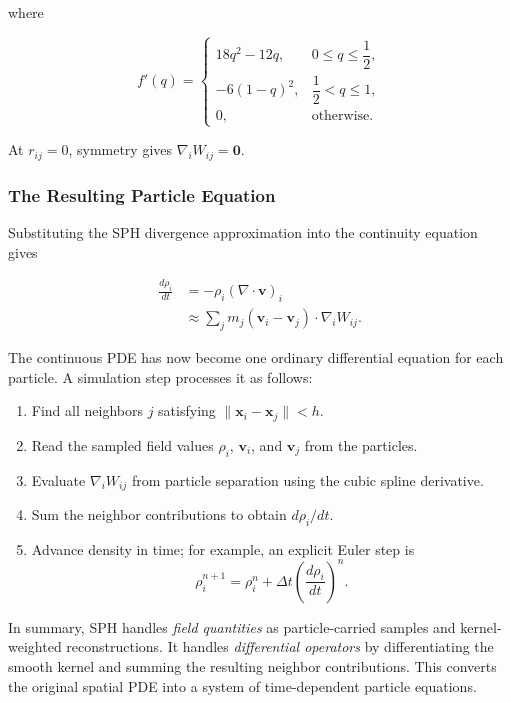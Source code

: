 \documentclass[11pt]{article}
\begin{document}
where

\begin{equation}
    f'(q)=
    \begin{cases}
        18q^2-12q,
            & 0 \leq q \leq \dfrac{1}{2}, \\
        -6(1-q)^2,
            & \dfrac{1}{2}<q\leq1, \\
        0,
            & \text{otherwise}.
    \end{cases}
\end{equation}

At $r_{ij}=0$, symmetry gives $\nabla_iW_{ij}=\mathbf{0}$.

\subsubsection{The Resulting Particle Equation}

Substituting the SPH divergence approximation into the continuity equation
gives

\begin{align}
    \frac{d\rho_i}{dt}
    &= -\rho_i(\nabla\cdot\mathbf{v})_i \\
    &\approx \sum_j m_j(\mathbf{v}_i-\mathbf{v}_j)
    \cdot\nabla_iW_{ij}.
\end{align}

The continuous PDE has now become one ordinary differential equation for each
particle. A simulation step processes it as follows:

\begin{enumerate}
    \item Find all neighbors $j$ satisfying
    $\lVert\mathbf{x}_i-\mathbf{x}_j\rVert<h$.
    \item Read the sampled field values $\rho_i$, $\mathbf{v}_i$, and
    $\mathbf{v}_j$ from the particles.
    \item Evaluate $\nabla_iW_{ij}$ from particle separation using the cubic
    spline derivative.
    \item Sum the neighbor contributions to obtain $d\rho_i/dt$.
    \item Advance density in time; for example, an explicit Euler step is
    \begin{equation}
        \rho_i^{n+1}
        = \rho_i^n + \Delta t
        \left(\frac{d\rho_i}{dt}\right)^n.
    \end{equation}
\end{enumerate}

In summary, SPH handles \emph{field quantities} as particle-carried samples and
kernel-weighted reconstructions. It handles \emph{differential operators} by
differentiating the smooth kernel and summing the resulting neighbor
contributions. This converts the original spatial PDE into a system of
time-dependent particle equations.
\end{document}
